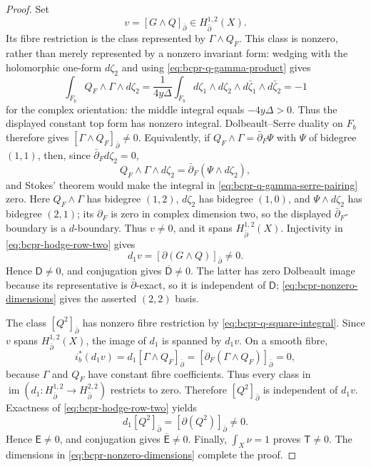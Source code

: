 \begin{proof}
Set
\begin{equation}
 v=[G\wedge Q]_{\bar\partial}
 \in H^{1,2}_{\bar\partial}(X).
\label{eq:bcpr-v-class}
\end{equation}
Its fibre restriction is the class represented by
$\Gamma\wedge Q_F$.  This class is nonzero, rather than merely represented
by a nonzero invariant form: wedging with the holomorphic one-form
$d\zeta_2$ and using \cref{eq:bcpr-q-gamma-product} gives
\begin{equation}
 \int_{F_b}Q_F\wedge\Gamma\wedge d\zeta_2
 =\frac1{4y\Delta}
   \int_{F_b}d\zeta_1\wedge d\zeta_2\wedge
                    d\bar\zeta_1\wedge d\bar\zeta_2
 =-1
\label{eq:bcpr-q-gamma-serre-pairing}
\end{equation}
for the complex orientation: the middle integral equals
$-4y\Delta>0$.  Thus the displayed constant top form has nonzero integral.
Dolbeault--Serre duality on $F_b$ therefore gives
$[\Gamma\wedge Q_F]_{\bar\partial}\ne0$.  Equivalently, if
$Q_F\wedge\Gamma=\bar\partial_F\Psi$ with $\Psi$ of bidegree $(1,1)$,
then, since $\bar\partial_Fd\zeta_2=0$,
\[
 Q_F\wedge\Gamma\wedge d\zeta_2
 =\bar\partial_F(\Psi\wedge d\zeta_2),
\]
and Stokes' theorem would make the integral in
\cref{eq:bcpr-q-gamma-serre-pairing} zero.  Here
$Q_F\wedge\Gamma$ has bidegree $(1,2)$,
$d\zeta_2$ has bidegree $(1,0)$, and
$\Psi\wedge d\zeta_2$ has bidegree $(2,1)$; its $\partial_F$ is zero in
complex dimension two, so the displayed $\bar\partial_F$-boundary is a
$d$-boundary.  Thus $v\neq0$, and it spans
$H^{1,2}_{\bar\partial}(X)$.  Injectivity in
\cref{eq:bcpr-hodge-row-two} gives
\begin{equation}
 d_1v=[\partial(G\wedge Q)]_{\bar\partial}\neq0.
\label{eq:bcpr-d-nonzero}
\end{equation}
Hence $\mathsf D\neq0$, and conjugation gives
$\overline{\mathsf D}\neq0$.  The latter has zero Dolbeault image because
its representative is $\bar\partial$-exact, so it is independent of
$\mathsf D$; \cref{eq:bcpr-nonzero-dimensions} gives the asserted
$(2,2)$ basis.

The class $[Q^2]_{\bar\partial}$ has nonzero fibre restriction by
\cref{eq:bcpr-q-square-integral}.  Since $v$ spans
$H^{1,2}_{\bar\partial}(X)$, the image of $d_1$ is spanned by $d_1v$.
On a smooth fibre,
\[
 i_b^*(d_1v)
 =d_1[\Gamma\wedge Q_F]_{\bar\partial}
 =[\partial_F(\Gamma\wedge Q_F)]_{\bar\partial}=0,
\]
because $\Gamma$ and $Q_F$ have constant fibre coefficients.  Thus every
class in $\operatorname{im}(d_1\colon H^{1,2}_{\bar\partial}\to
H^{2,2}_{\bar\partial})$ restricts to zero.
Therefore $[Q^2]_{\bar\partial}$ is independent of $d_1v$.  Exactness of
\cref{eq:bcpr-hodge-row-two} yields
\begin{equation}
 d_1[Q^2]_{\bar\partial}
 =[\partial(Q^2)]_{\bar\partial}\neq0.
\label{eq:bcpr-e-nonzero}
\end{equation}
Hence $\mathsf E\neq0$, and conjugation gives
$\overline{\mathsf E}\neq0$.  Finally, $\int_X\nu=1$ proves
$\mathsf T\neq0$.  The dimensions in
\cref{eq:bcpr-nonzero-dimensions} complete the proof.
\end{proof}

